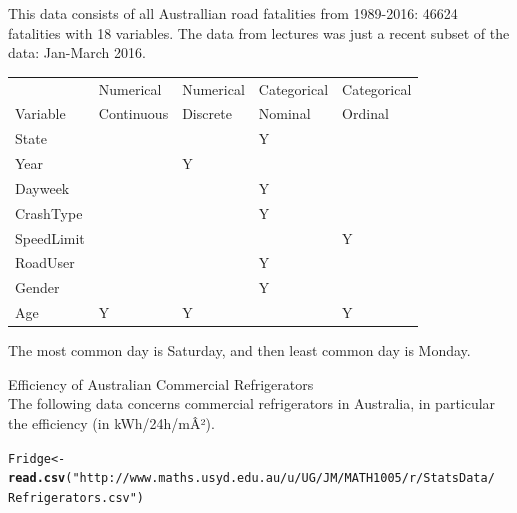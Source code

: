 \documentclass[bigtut]{tutorial}\usepackage[]{graphicx}\usepackage[]{color}
\makeatletter
\newcommand{\hlstr}[1]{\textcolor[rgb]{0.192,0.494,0.8}{#1}}%
\newcommand{\hlstd}[1]{\textcolor[rgb]{0.345,0.345,0.345}{#1}}%
\newcommand{\hlkwb}[1]{\textcolor[rgb]{0.69,0.353,0.396}{#1}}%
\newcommand{\hlkwd}[1]{\textcolor[rgb]{0.737,0.353,0.396}{\textbf{#1}}}%
\newenvironment{kframe}{%
 \def\at@end@of@kframe{}%
 \ifinner\ifhmode%
  \def\at@end@of@kframe{\end{minipage}}%
  \begin{minipage}{\columnwidth}%
 \fi\fi%
 \def\FrameCommand##1{\hskip\@totalleftmargin \hskip-\fboxsep
 \colorbox{shadecolor}{##1}\hskip-\fboxsep
     \hskip-\linewidth \hskip-\@totalleftmargin \hskip\columnwidth}%
 \MakeFramed {\advance\hsize-\width
   \@totalleftmargin\z@ \linewidth\hsize
   \@setminipage}}%
 {\par\unskip\endMakeFramed%
 \at@end@of@kframe}
\newenvironment{knitrout}{}{} %
\makeatother
\begin{document}
\begin{tutorial}
\begin{questions}

\vspace{.5cm}
\begin{solution}
This data consists of all Australlian road fatalities from 1989-2016: 46624 fatalities with 18 variables. The data from lectures was just a recent subset of the data: Jan-March 2016.  \\

\begin{tabular}{|l|l|l|l|l|} \hline
& Numerical & Numerical & Categorical & Categorical \\
Variable & Continuous \hspace{1cm} &  Discrete \hspace{1cm} &  Nominal \hspace{1cm} &  Ordinal \hspace{1cm} \\ \hline
State & & & Y & \\ \hline
Year & & Y & & \\ \hline
Dayweek & &  & Y & \\ \hline
CrashType & & & Y & \\ \hline
SpeedLimit & & & & Y \\ \hline
RoadUser & & & Y & \\ \hline
Gender & & & Y & \\ \hline
Age & Y & Y & & Y \\ \hline
\end{tabular}

\vspace{.5cm}
The most common day is Saturday, and then least common day is Monday.
\end{solution}

\question Efficiency of Australian Commercial Refrigerators \\

The following data concerns commercial refrigerators in Australia, in particular the
efficiency (in kWh/24h/mÂ²).

\begin{knitrout}
\color{fgcolor}\begin{kframe}
\begin{alltt}
\hlstd{Fridge} \hlkwb{<-} \hlkwd{read.csv}\hlstd{(}\hlstr{"http://www.maths.usyd.edu.au/u/UG/JM/MATH1005/r/StatsData/
                 Refrigerators.csv"}\hlstd{)}
\end{alltt}
\end{kframe}
\end{knitrout}


\end{questions}
\end{tutorial}
\end{document}
